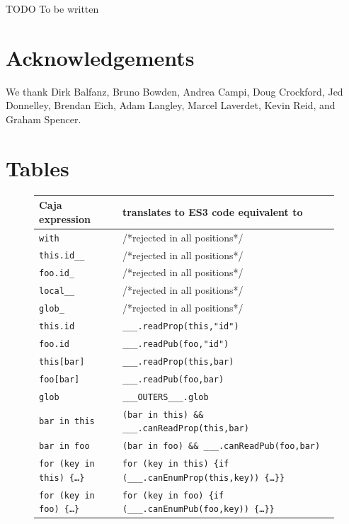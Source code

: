 \documentclass[letterpaper,twocolumn,10pt]{article}
\newcommand{\code}[1]{{\tt {#1}}}              %
\begin{document}
TODO To be written

\section{Acknowledgements}

We thank 
Dirk Balfanz,
Bruno Bowden,
Andrea Campi,
Doug Crockford,
Jed Donnelley,
Brendan Eich,
Adam Langley,
Marcel Laverdet,
Kevin Reid,
and
Graham Spencer.

\appendix

\section{Tables}


\begin{figure}
\begin{tabular}{ll}
  Caja expression    & translates to ES3 code equivalent to\\ 
  \hline
  \code{with}        & /*rejected in all positions*/ \\
  \hline
  \code{this.id\_\_} & /*rejected in all positions*/ \\
  \code{foo.id\_}    & /*rejected in all positions*/ \\      
  \code{local\_\_}   & /*rejected in all positions*/ \\        
  \code{glob\_}      & /*rejected in all positions*/ \\        
  \hline
  \code{this.id}     & \code{\_\_\_.readProp(this,"id")}\\
  \code{foo.id}      & \code{\_\_\_.readPub(foo,"id")} \\
  \code{this[bar]}   & \code{\_\_\_.readProp(this,bar)} \\
  \code{foo[bar]}    & \code{\_\_\_.readPub(foo,bar)}  \\
  \code{glob}        & \code{\_\_\_OUTERS\_\_\_.glob} \\
  \hline
  \code{bar in this}           
    & \code{(bar in this) \&\& \_\_\_.canReadProp(this,bar)} \\
  \code{bar in foo}            
    & \code{(bar in foo) \&\& \_\_\_.canReadPub(foo,bar)} \\
  \code{for (key in this)\ \{\ldots\}} 
    &\code{for (key in this)
     \{if (\_\_\_.canEnumProp(this,key))\ \{\ldots\}\}}\\
  \code{for (key in foo)\ \{\ldots\}}  
    & \code{for (key in foo)
     \{if (\_\_\_.canEnumPub(foo,key))\ \{\ldots\}\}} \\

\end{tabular}
\end{figure}
\end{document}
